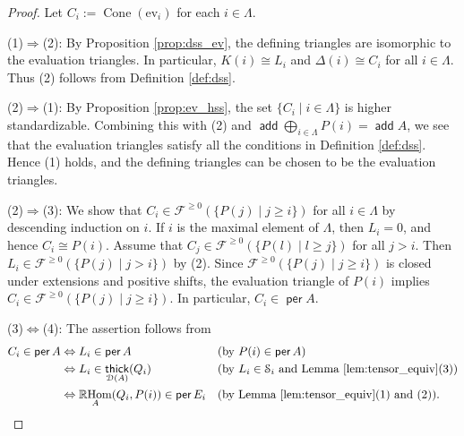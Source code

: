 \documentclass[a4paper,reqno,11pt]{amsart}
\numberwithin{equation}{section}
\theoremstyle{definition}
\newcommand{\D}{\mathcal{D}}
\newcommand{\F}{\mathcal{F}}
\renewcommand{\S}{\mathcal{S}}
\newcommand{\bde}{\Delta}
\newcommand{\ev}{\mathrm{ev}}
\DeclareMathOperator{\Co}{Cone}
\DeclareMathOperator{\add}{\mathsf{add}}
\DeclareMathOperator{\thick}{\mathsf{thick}}
\DeclareMathOperator{\per}{\mathsf{per}}
\DeclareMathOperator{\RHom}{\mathbb{R}Hom}
\begin{document}
\begin{proof}
Let $C_{i}:=\Co(\ev_{i})$ for each $i\in\Lambda$.

(1)$\Rightarrow$(2): By Proposition \ref{prop:dss_ev}, the defining triangles are isomorphic to the evaluation triangles.
In particular, $K(i)\cong L_{i}$ and $\bde(i)\cong C_{i}$ for all $i\in\Lambda$.
Thus (2) follows from Definition \ref{def:dss}.

(2)$\Rightarrow$(1): By Proposition \ref{prop:ev_hss}, the set $\{C_{i}\mid i\in\Lambda\}$ is higher standardizable.
Combining this with (2) and $\add\bigoplus_{i\in\Lambda}P(i)=\add A$, we see that the evaluation triangles satisfy all the conditions in Definition \ref{def:dss}.
Hence (1) holds, and the defining triangles can be chosen to be the evaluation triangles.

(2)$\Rightarrow$(3): We show that $C_{i}\in\F^{\geq 0}(\{P(j)\mid j\geq i\})$ for all $i\in\Lambda$ by descending induction on $i$.
If $i$ is the maximal element of $\Lambda$, then $L_{i}=0$, and hence $C_{i}\cong P(i)$.
Assume that $C_{j}\in\F^{\geq 0}(\{P(l)\mid l\geq j\})$ for all $j>i$.
Then $L_{i}\in\F^{\geq 0}(\{P(j)\mid j>i\})$ by (2).
Since $\F^{\geq 0}(\{P(j)\mid j\geq i\})$ is closed under extensions and positive shifts, the evaluation triangle of $P(i)$ implies $C_{i}\in\F^{\geq 0}(\{P(j)\mid j\geq i\})$.
In particular, $C_{i}\in\per A$.

(3)$\Leftrightarrow$(4): The assertion follows from
\begin{align}
C_{i}\in\per A
&\Leftrightarrow L_{i}\in\per A&&(\text{by }P(i)\in\per A)\notag\\
&\Leftrightarrow L_{i}\in\thick_{\D(A)}(Q_{i})&&(\text{by }L_{i}\in\S_{i}\text{ and Lemma \ref{lem:tensor_equiv}(3)})\notag\\
&\Leftrightarrow \RHom_{A}(Q_{i},P(i))\in\per E_{i}&&(\text{by Lemma \ref{lem:tensor_equiv}(1) and (2)}).\notag
\end{align}


\end{proof}
\end{document}
